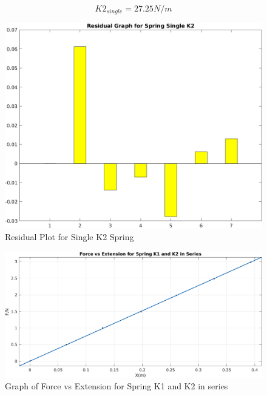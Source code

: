 $$ K2_{single} = 27.25 N/m $$

\newpage
\begin{center}
\begin{figure}[h!]
    \centering
    \includegraphics[width=\textwidth]{figures/k2_single.png}
    \caption{Residual Plot for Single K2 Spring}
    \label{fig:k1_Se_R}
\end{figure}
\end{center}


\begin{center}
\begin{figure}[h!]
    \centering
    \includegraphics[width=\textwidth]{figures/k1_k2_ser.png}
    \caption{Graph of Force vs Extension for Spring K1 and K2 in series}
    \label{fig:k1_Se_R}
\end{figure}
\end{center}

